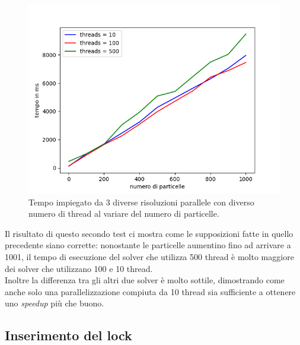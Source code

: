 \documentclass[10pt,twocolumn,letterpaper]{article}
\begin{document}
\begin{figure}[H]
\includegraphics[width=1.1\linewidth]{test/test3_2} 
\caption{\small Tempo impiegato da 3 diverse risoluzioni parallele con diverso numero di thread al variare del numero di particelle.}
\label{t3}
\end{figure}

Il risultato di questo secondo test ci mostra come le supposizioni fatte in quello precedente siano corrette: nonostante le particelle aumentino fino ad arrivare a 1001, il tempo di esecuzione del solver che utilizza 500 thread è molto maggiore dei solver che utilizzano 100 e 10 thread.\\
Inoltre la differenza tra gli altri due solver è molto sottile, dimostrando come anche solo una parallelizzazione compiuta da 10 thread sia sufficiente a ottenere uno \textit{speedup} più che buono.

\subsection{Inserimento del lock}
\end{document}
